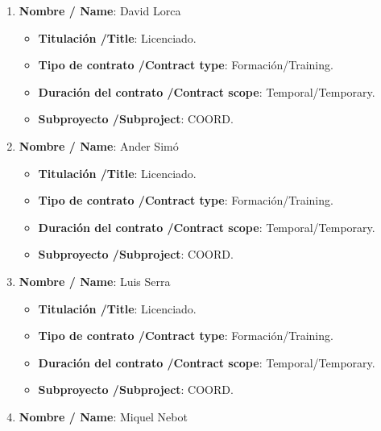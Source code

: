 

\begin{enumerate}
\item {\bf Nombre / Name}: David Lorca
\begin{itemize}
\item {\bf Titulación /Title}: Licenciado. 
\item {\bf Tipo de contrato /Contract type}: Formación/Training. 
\item {\bf Duración del contrato /Contract scope}: Temporal/Temporary. 
\item {\bf Subproyecto /Subproject}: COORD. 
\end{itemize}
\item {\bf Nombre / Name}: Ander Simó
\begin{itemize}
\item {\bf Titulación /Title}: Licenciado. 
\item {\bf Tipo de contrato /Contract type}: Formación/Training. 
\item {\bf Duración del contrato /Contract scope}: Temporal/Temporary. 
\item {\bf Subproyecto /Subproject}: COORD. 
\end{itemize}
\item {\bf Nombre / Name}: Luis Serra
\begin{itemize}
\item {\bf Titulación /Title}: Licenciado. 
\item {\bf Tipo de contrato /Contract type}: Formación/Training. 
\item {\bf Duración del contrato /Contract scope}: Temporal/Temporary. 
\item {\bf Subproyecto /Subproject}: COORD. 
\end{itemize}
\item {\bf Nombre / Name}: Miquel Nebot

\end{enumerate}
